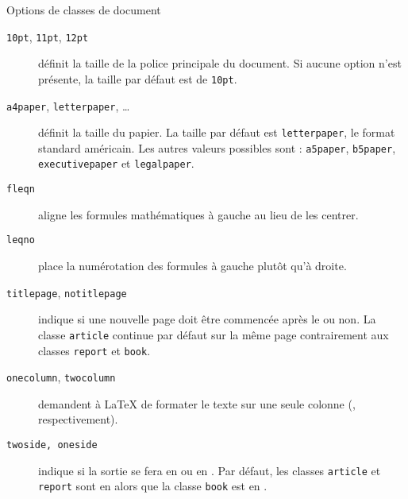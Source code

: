 \begin{table}[!bp]
\caption{Options de classes de document} \label{options}
\begin{lined}{\textwidth}
\begin{flushleft}
\begin{description}
\item[\normalfont\texttt{10pt}, \texttt{11pt}, \texttt{12pt}] \quad
définit la taille de la police principale du document. Si aucune
option n'est présente, la taille par défaut est de \texttt{10pt}.
\item[\normalfont\texttt{a4paper}, \texttt{letterpaper}, \dots]   \quad
définit la taille du papier. La taille par défaut est
\texttt{letterpaper}, le format standard américain. Les autres valeurs
possibles sont : \texttt{a5paper}, \texttt{b5paper}, \texttt{executivepaper}
  et \texttt{legalpaper}. 
   

\item[\normalfont\texttt{fleqn}] \quad aligne les formules
  mathématiques à gauche au lieu de les centrer.

\item[\normalfont\texttt{leqno}] \quad place la numérotation des
formules à gauche plutôt qu'à droite.

\item[\normalfont\texttt{titlepage}, \texttt{notitlepage}] \quad
indique si une nouvelle page doit être commencée après le  ou non. La classe \texttt{article} continue par défaut sur
la même page contrairement aux classes \texttt{report} et
\texttt{book}.  

\item[\normalfont\texttt{onecolumn}, \texttt{twocolumn}] \quad
demandent à \LaTeX{} de formater le texte sur une seule colonne
(, respectivement).

\item[\normalfont\texttt{twoside, oneside}] \quad indique si la sortie
se fera en  ou en . Par défaut, les classes
\texttt{article} et \texttt{report} sont en 
alors que la classe \texttt{book} est en .


\end{description}
\end{flushleft}
\end{lined}
\end{table}
